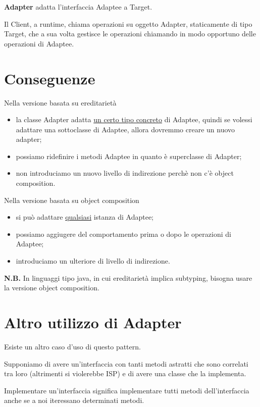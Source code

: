 \textbf{Adapter} adatta l'interfaccia Adaptee a Target.

\medskip
Il Client, a runtime, chiama operazioni su oggetto Adapter, staticamente di tipo Target, che a sua volta gestisce le operazioni chiamando in modo opportuno delle operazioni 
di Adaptee.

\section{Conseguenze}

Nella versione basata su ereditarietà
\begin{itemize}
    \item la classe Adapter adatta \underline{un certo tipo concreto} di Adaptee, quindi se volessi adattare una sottoclasse di Adaptee, allora dovremmo creare un 
    nuovo adapter;
    \item possiamo ridefinire i metodi Adaptee in quanto è superclasse di Adapter;
    \item non introduciamo un nuovo livello di indirezione perchè non c'è object composition.
\end{itemize}

Nella versione basata su object composition
\begin{itemize} 
    \item si può adattare \underline{qualsiasi} istanza di Adaptee;
    \item possiamo aggiugere del comportamento prima o dopo le operazioni di Adaptee;
    \item introduciamo un ulteriore di livello di indirezione.
\end{itemize}

\textbf{N.B.} In linguaggi tipo java, in cui ereditarietà implica subtyping, bisogna usare la versione object composition.

\section{Altro utilizzo di Adapter}

Esiste un altro caso d'uso di questo pattern.

Supponiamo di avere un'interfaccia con tanti metodi astratti che sono correlati tra loro (altrimenti si violerebbe ISP) e di avere una classe che la implementa.

Implementare un'interfaccia significa implementare tutti metodi dell'interfaccia anche se a noi iteressano determinati metodi.

